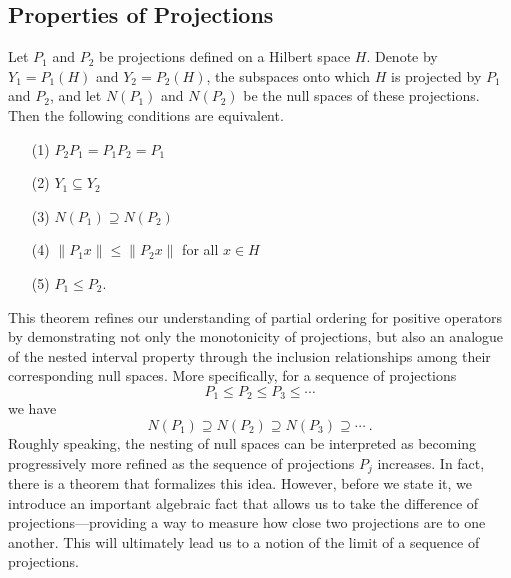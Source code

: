 \subsection{Properties of Projections}

\begin{theorem}\label{9.6-1}
    Let \( {P}_{1}  \) and \( {P}_{2} \) be projections defined on a Hilbert space \( H  \). Denote by \( {Y}_{1} = {P}_{1}(H) \) and \( {Y}_{2} = {P}_{2}(H) \), the subspaces onto which \( H  \) is projected by \( {P}_{1} \) and \( {P}_{2} \), and let \( N({P}_{1}) \) and \( N({P}_{2}) \) be the null spaces of these projections. Then the following conditions are equivalent.
    \begin{enumerate}
        \item[(1)] \( {P}_{2}{P}_{1} = {P}_{1} {P}_{2} = {P}_{1} \)
        \item[(2)] \( {Y}_{1} \subseteq {Y}_{2} \)
        \item[(3)] \( N({P}_{1}) \supseteq N({P}_{2}) \)
        \item[(4)] \( \|{P}_{1}x\| \leq \|{P}_{2}x \|  \) for all \( x \in H  \)
        \item[(5)] \( {P}_{1} \leq {P}_{2} \).
    \end{enumerate}
\end{theorem}

 This theorem refines our understanding of partial ordering for positive operators by demonstrating not only the monotonicity of projections, but also an analogue of the nested interval property through the inclusion relationships among their corresponding null spaces. More specifically, for a sequence of projections 
\[  {P}_{1} \leq {P}_{2} \leq {P}_{3} \leq \cdots  \]
we have
\[  N({P}_{1}) \supseteq N({P}_{2}) \supseteq N({P}_{3}) \supseteq \cdots \ .  \]
Roughly speaking, the nesting of null spaces can be interpreted as becoming progressively more refined as the sequence of projections \( {P}_{j} \) increases. In fact, there is a theorem that formalizes this idea. However, before we state it, we introduce an important algebraic fact that allows us to take the difference of projections—providing a way to measure how close two projections are to one another. This will ultimately lead us to a notion of the limit of a sequence of projections.




